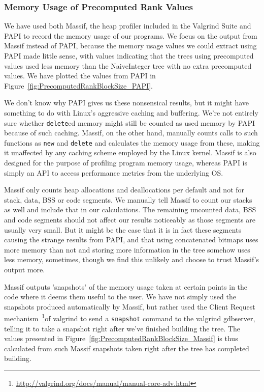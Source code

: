\restoregeometry




\subsubsection{Memory Usage of Precomputed Rank Values}
We have used both Massif, the heap profiler included in the Valgrind Suite and PAPI to record the memory usage of our programs.
We focus on the output from Massif instead of PAPI, because the memory usage values we could extract using PAPI made little sense, with values indicating that the trees using precomputed values used less memory than the NaiveInteger tree with no extra precomputed values.
We have plotted the values from PAPI in Figure~\ref{fig:PrecomputedRankBlockSize_PAPI}.

We don't know why PAPI gives us these nonsensical results, but it might have something to do with Linux's aggressive caching and buffering.
We're not entirely sure whether \texttt{delete}ed memory might still be counted as used memory by PAPI because of such caching.
Massif, on the other hand, manually counts calls to such functions as \texttt{new} and \texttt{delete} and calculates the memory usage from these, making it unaffected by any caching scheme employed by the Linux kernel.
Massif is also designed for the purpose of profiling program memory usage, whereas PAPI is simply an API to access performance metrics from the underlying OS.

Massif only counts heap allocations and deallocations per default and not for stack, data, BSS or code segments.
We manually tell Massif to count our stacks as well and include that in our calculations.
The remaining uncounted data, BSS and code segments should not affect our results noticeably as those segments are usually very small.
But it might be the case that it is in fact these segments causing the strange results from PAPI, and that using concatenated bitmaps uses more memory than not and storing more information in the tree somehow uses less memory, sometimes, though we find this unlikely and choose to trust Massif's output more.

Massif outputs 'snapshots' of the memory usage taken at certain points in the code where it deems them useful to the user.
We have not simply used the snapshots produced automatically by Massif, but rather used the Client Request mechanism~\footnote{\url{http://valgrind.org/docs/manual/manual-core-adv.html}}of valgrind to send a \texttt{snapshot} command to the valgrind gdbserver, telling it to take a snapshot right after we've finished building the tree.
The values presented in Figure~\ref{fig:PrecomputedRankBlockSize_Massif} is thus calculated from such Massif snapshots taken right after the tree has completed building.

